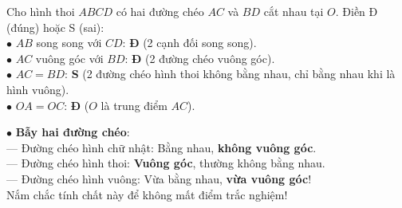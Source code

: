 \documentclass[14pt,a4paper,oneside]{extbook}
\begin{document}
\noindent
\begin{minipage}[t]{0.53\textwidth}
  \begin{tcolorbox}[
    enhanced,
    title={\footnotesize\bfseries\color{white}\faCheckCircle\ Ví dụ thực hành chuẩn mực},
    colback=green!2!white,
    colframe=green!60!black,
    arc=2.5mm, boxrule=0.8pt, top=1.8mm, bottom=1.8mm, left=2.2mm, right=2.2mm
  ]
    \footnotesize
    Cho hình thoi $ABCD$ có hai đường chéo $AC$ và $BD$ cắt nhau tại $O$. Điền Đ (đúng) hoặc S (sai):\\
    $\bullet$ $AB$ song song với $CD$: \textbf{Đ} (2 cạnh đối song song).\\
    $\bullet$ $AC$ vuông góc với $BD$: \textbf{Đ} (2 đường chéo vuông góc).\\
    $\bullet$ $AC = BD$: \textbf{S} (2 đường chéo hình thoi không bằng nhau, chỉ bằng nhau khi là hình vuông).\\
    $\bullet$ $OA = OC$: \textbf{Đ} ($O$ là trung điểm $AC$).
  \end{tcolorbox}
\end{minipage}%
\hfill
\begin{minipage}[t]{0.45\textwidth}
  \begin{tcolorbox}[
    enhanced,
    title={\footnotesize\bfseries\color{white}\faExclamationTriangle\ Mẹo tránh bẫy trắc nghiệm},
    colback=red!2!white,
    colframe=red!70!black,
    arc=2.5mm, boxrule=0.8pt, top=1.8mm, bottom=1.8mm, left=2.2mm, right=2.2mm
  ]
    \footnotesize
    $\bullet$ \textbf{Bẫy hai đường chéo}:\\
    --- Đường chéo hình chữ nhật: Bằng nhau, \textbf{không vuông góc}.\\
    --- Đường chéo hình thoi: \textbf{Vuông góc}, thường không bằng nhau.\\
    --- Đường chéo hình vuông: Vừa bằng nhau, \textbf{vừa vuông góc}!\\
    Nắm chắc tính chất này để không mất điểm trắc nghiệm!
  \end{tcolorbox}
\end{minipage}
\end{document}
